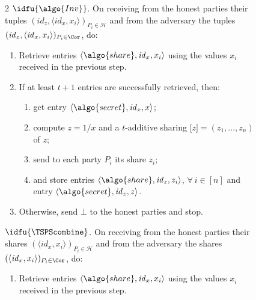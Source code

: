 \begin{figure}
\begin{minipage}{1.1\textwidth}
\begin{framed}
\begin{multicols}{2}
        {$\idfu{\algo{Inv}}$.} On receiving from the honest parties their
        tuples $(\mathit{id}_z, \langle \mathit{id}_x, x_i\rangle)_{{P}_i \in
        \mathcal{H}}$ and from the adversary the tuples $(\mathit{id}_z,
        \langle \mathit{id}_x, x_i \rangle)_{{P}_i \in \Cor}$, do:

        \begin{enumerate}

          \item Retrieve entries $\langle \algo{share}, \mathit{id}_x,
            x_i\rangle$ using the values $x_i$ received in the previous step.

          \item If at least $t+1$ entries are successfully retrieved, then:

            \begin{enumerate}

              \item get entry $\langle \algo{secret}, \mathit{id}_x, x
                \rangle$;

              \item compute $z = 1/x$ and a $t$-additive sharing $\lbrack
                z\rbrack  =(z_1, ..., z_n)$ of $z$;

              \item send to each party ${P}_i$ its share $z_i$;

              \item and store entries $\langle \algo{share}, \mathit{id}_z,
                z_i\rangle$, $\forall \ i \in [n]$ and entry $\langle
                \algo{secret}, \mathit{id}_z, z\rangle$.

            \end{enumerate}

          \item Otherwise, send $\bot$ to the honest parties and stop.

        \end{enumerate}

        {$\idfu{\TSPScombine}$.} On receiving from the honest parties their
        shares $(\langle \mathit{id}_x,x_i\rangle)_{{P}_i \in \mathcal{H}}$ and
        from the adversary the shares $(\langle \mathit{id}_x, x_i
        \rangle)_{{P}_i \in \Cor}$, do:

        \begin{enumerate}

          \item Retrieve entries $\langle \algo{share}, \mathit{id}_x,
            x_i\rangle$ using the values $x_i$ received in the previous step.


\end{enumerate}
\end{multicols}
\end{framed}
\end{minipage}
\end{figure}
